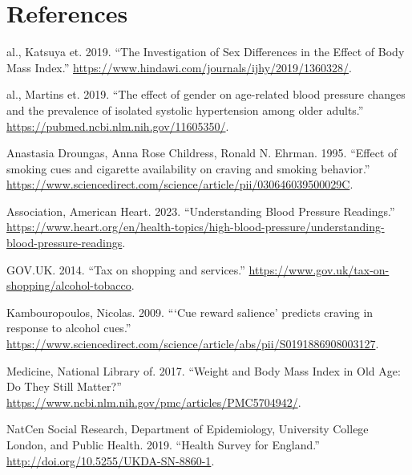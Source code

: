 \documentclass[
  11pt,
  twocolumn]{article}
\newlength{\cslhangindent}
\newlength{\cslentryspacingunit} %
\newenvironment{CSLReferences}[2] %
 {%
  \setlength{\parindent}{0pt}
  \ifodd #1
  \let\oldpar\par
  \def\par{\hangindent=\cslhangindent\oldpar}
  \fi
  \setlength{\parskip}{#2\cslentryspacingunit}
 }%
 {}
\begin{document}
\clearpage

\hypertarget{references}{%
\section*{References}\label{references}}

\hypertarget{refs}{}
\begin{CSLReferences}{1}{0}
\leavevmode{}%
al., Katsuya et. 2019. {``{The Investigation of Sex Differences in the
Effect of Body Mass Index}.''}
\url{https://www.hindawi.com/journals/ijhy/2019/1360328/}.

\leavevmode{}%
al., Martins et. 2019. {``{The effect of gender on age-related blood
pressure changes and the prevalence of isolated systolic hypertension
among older adults}.''} \url{https://pubmed.ncbi.nlm.nih.gov/11605350/}.

\leavevmode{}%
Anastasia Droungas, Anna Rose Childress, Ronald N. Ehrman. 1995.
{``{Effect of smoking cues and cigarette availability on craving and
smoking behavior}.''}
\url{https://www.sciencedirect.com/science/article/pii/030646039500029C}.

\leavevmode{}%
Association, American Heart. 2023. {``{Understanding Blood Pressure
Readings}.''}
\url{https://www.heart.org/en/health-topics/high-blood-pressure/understanding-blood-pressure-readings}.

\leavevmode{}%
GOV.UK. 2014. {``{Tax on shopping and services}.''}
\url{https://www.gov.uk/tax-on-shopping/alcohol-tobacco}.

\leavevmode{}%
Kambouropoulos, Nicolas. 2009. {``{{`Cue reward salience'} predicts
craving in response to alcohol cues}.''}
\url{https://www.sciencedirect.com/science/article/abs/pii/S0191886908003127}.

\leavevmode{}%
Medicine, National Library of. 2017. {``{Weight and Body Mass Index in
Old Age: Do They Still Matter?}''}
\url{https://www.ncbi.nlm.nih.gov/pmc/articles/PMC5704942/}.

\leavevmode{}%
NatCen Social Research, Department of Epidemiology, University College
London, and Public Health. 2019. {``{Health Survey for England}.''}
\url{http://doi.org/10.5255/UKDA-SN-8860-1}.


\end{CSLReferences}
\end{document}
